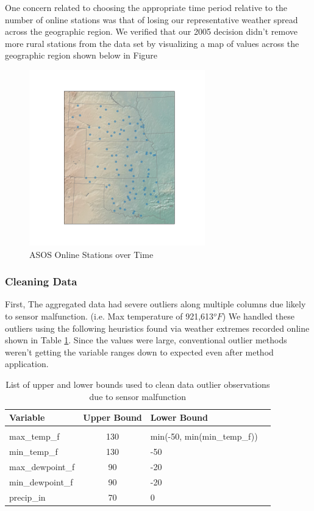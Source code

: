 \documentclass[twoside,11pt]{article}
\begin{document}
	One concern related to choosing the appropriate time period relative to the number of online stations was that of losing our representative weather spread across the geographic region. We verified that our 2005 decision didn't remove more rural stations from the data set by visualizing a map of values across the geographic region shown below in Figure 
	
	\begin{figure}[htbp]
		\centering
		\includegraphics[width=3in]{ASOSspread.png}
		\caption{ASOS Online Stations over Time}
		\label{fig:asosspread}
	\end{figure}
	
	\subsubsection{Cleaning Data}
	First, The aggregated data had severe outliers along multiple columns due likely to sensor malfunction. (i.e. Max temperature of 921,613$^oF$) We handled these outliers using the following heuristics found via weather extremes recorded online shown in Table \ref{tab:bounds}. Since the values were large, conventional outlier methods weren't getting the variable ranges down to expected even after method application.  

	\begin{table}[htbp]
		\centering
		\begin{tabular}{lclc}
			Variable & Upper Bound & Lower Bound \\
			\hline \\[-11pt]
			max\_temp\_f & 130 & min(-50, min(min\_temp\_f))\\
			min\_temp\_f & 130 & -50 \\
			max\_dewpoint\_f & 90 & -20\\
			min\_dewpoint\_f & 90 & -20\\
			precip\_in & 70 & 0\\
			\hline
		\end{tabular}
		\label{tab:bounds}
		\caption{List of upper and lower bounds used to clean data outlier observations due to sensor malfunction}
	\end{table}
\end{document}
